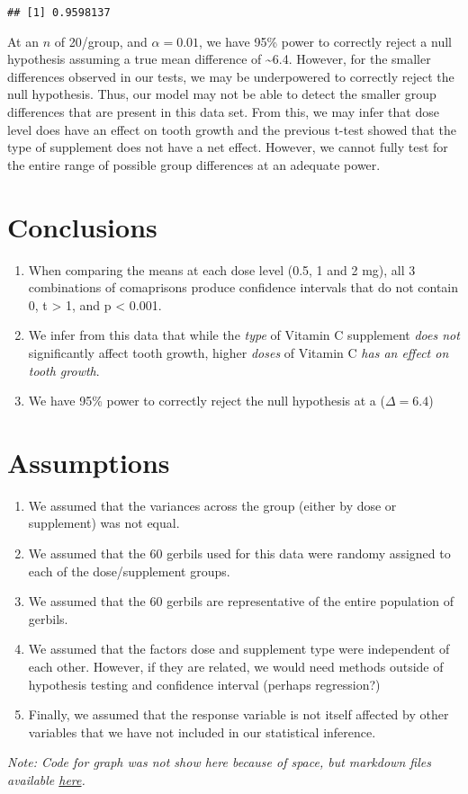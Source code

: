 \documentclass[]{article}
\begin{document}
\begin{verbatim}
## [1] 0.9598137
\end{verbatim}

At an \(n\) of 20/group, and \(\alpha=0.01\), we have 95\% power to
correctly reject a null hypothesis assuming a true mean difference of
\textasciitilde{}6.4. However, for the smaller differences observed in
our tests, we may be underpowered to correctly reject the null
hypothesis. Thus, our model may not be able to detect the smaller group
differences that are present in this data set. From this, we may infer
that dose level does have an effect on tooth growth and the previous
t-test showed that the type of supplement does not have a net effect.
However, we cannot fully test for the entire range of possible group
differences at an adequate power.

\section{Conclusions}\label{conclusions}

\begin{enumerate}
\def\labelenumi{\arabic{enumi}.}
\itemsep1pt\parskip0pt
\item
  When comparing the means at each dose level (0.5, 1 and 2 mg), all 3
  combinations of comaprisons produce confidence intervals that do not
  contain 0, t \textgreater{} 1, and p \textless{} 0.001.
\item
  We infer from this data that while the \emph{type} of Vitamin C
  supplement \emph{does not} significantly affect tooth growth, higher
  \emph{doses} of Vitamin C \emph{has an effect on tooth growth}.
\item
  We have 95\% power to correctly reject the null hypothesis at a
  (\(\Delta = 6.4\))
\end{enumerate}

\section{Assumptions}\label{assumptions}

\begin{enumerate}
\def\labelenumi{\arabic{enumi}.}
\itemsep1pt\parskip0pt
\item
  We assumed that the variances across the group (either by dose or
  supplement) was not equal.
\item
  We assumed that the 60 gerbils used for this data were randomy
  assigned to each of the dose/supplement groups.
\item
  We assumed that the 60 gerbils are representative of the entire
  population of gerbils.
\item
  We assumed that the factors dose and supplement type were independent
  of each other. However, if they are related, we would need methods
  outside of hypothesis testing and confidence interval (perhaps
  regression?)
\item
  Finally, we assumed that the response variable is not itself affected
  by other variables that we have not included in our statistical
  inference.
\end{enumerate}

\emph{Note: Code for graph was not show here because of space, but
markdown files available
\href{https://github.com/anandi42/Stat_Inf/blob/master/CourseProj_part2.Rmd}{here}.}
\end{document}
